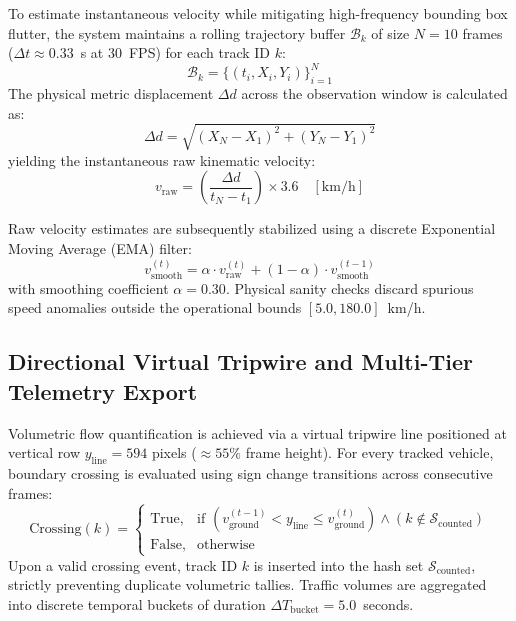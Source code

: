 \documentclass[conference]{IEEEtran}
\begin{document}
To estimate instantaneous velocity while mitigating high-frequency bounding box flutter, the system maintains a rolling trajectory buffer $\mathcal{B}_k$ of size $N = 10$ frames ($\Delta t \approx 0.33$~s at 30~FPS) for each track ID $k$:
\begin{equation}
\mathcal{B}_k = \{(t_i, X_i, Y_i)\}_{i=1}^N
\end{equation}
The physical metric displacement $\Delta d$ across the observation window is calculated as:
\begin{equation}
\Delta d = \sqrt{(X_N - X_1)^2 + (Y_N - Y_1)^2}
\end{equation}
yielding the instantaneous raw kinematic velocity:
\begin{equation}
v_{\text{raw}} = \left( \frac{\Delta d}{t_N - t_1} \right) \times 3.6 \quad [\text{km/h}]
\end{equation}

Raw velocity estimates are subsequently stabilized using a discrete Exponential Moving Average (EMA) filter:
\begin{equation}
v_{\text{smooth}}^{(t)} = \alpha \cdot v_{\text{raw}}^{(t)} + (1 - \alpha) \cdot v_{\text{smooth}}^{(t-1)}
\label{eq:ema}
\end{equation}
with smoothing coefficient $\alpha = 0.30$. Physical sanity checks discard spurious speed anomalies outside the operational bounds $[5.0, 180.0]$~km/h.

\subsection{Directional Virtual Tripwire and Multi-Tier Telemetry Export}
Volumetric flow quantification is achieved via a virtual tripwire line positioned at vertical row $y_{\text{line}} = 594$ pixels ($\approx 55\%$ frame height). For every tracked vehicle, boundary crossing is evaluated using sign change transitions across consecutive frames:
\begin{equation}
\text{Crossing}(k) = \begin{cases} 
\text{True}, & \text{if } (v_{\text{ground}}^{(t-1)} < y_{\text{line}} \le v_{\text{ground}}^{(t)}) \land (k \notin \mathcal{S}_{\text{counted}}) \\
\text{False}, & \text{otherwise}
\end{cases}
\end{equation}
Upon a valid crossing event, track ID $k$ is inserted into the hash set $\mathcal{S}_{\text{counted}}$, strictly preventing duplicate volumetric tallies. Traffic volumes are aggregated into discrete temporal buckets of duration $\Delta T_{\text{bucket}} = 5.0$~seconds.
\end{document}

